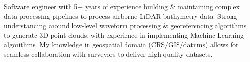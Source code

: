 \begin{justify}
Software engineer with 5+ years of experience building \& maintaining complex data processing pipelines to process airborne LiDAR bathymetry data. Strong understanding around low-level waveform processing \& georeferencing algorithms to generate 3D point-clouds, with experience in implementing Machine Learning algorithms. My knowledge in geospatial domain (CRS/GIS/datums) allows for seamless collaboration with surveyors to deliver high quality datasets.
\end{justify}


